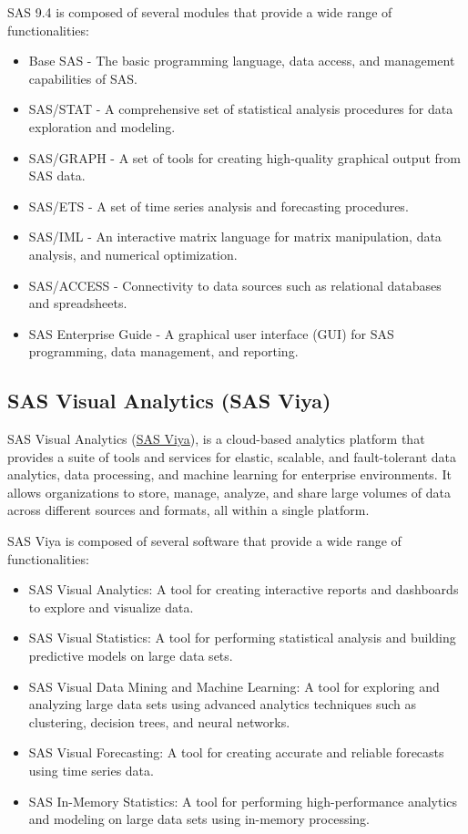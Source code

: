 SAS 9.4 is composed of several modules that provide a wide range of functionalities:
\begin{itemize}
    \item Base SAS - The basic programming language, data access, and management capabilities of SAS.
    \item SAS/STAT - A comprehensive set of statistical analysis procedures for data exploration and modeling.
    \item SAS/GRAPH - A set of tools for creating high-quality graphical output from SAS data.
    \item SAS/ETS - A set of time series analysis and forecasting procedures.
    \item SAS/IML - An interactive matrix language for matrix manipulation, data analysis, and numerical optimization.
    \item SAS/ACCESS - Connectivity to data sources such as relational databases and spreadsheets.
    \item SAS Enterprise Guide - A graphical user interface (GUI) for SAS programming, data management, and reporting.
\end{itemize}

\subsection{SAS Visual Analytics (SAS Viya)}
SAS Visual Analytics (\href{https://documentation.sas.com/doc/en/pgmsascdc/9.4_3.5/pgmsasgswlcm/home.htm}{SAS Viya}), is a cloud-based analytics platform that provides a suite of tools and services for elastic, scalable, and fault-tolerant data analytics, data processing, and machine learning for enterprise environments. It allows organizations to store, manage, analyze, and share large volumes of data across different sources and formats, all within a single platform. 

SAS Viya is composed of several software that provide a wide range of functionalities:

\begin{itemize}
    \item SAS Visual Analytics: A tool for creating interactive reports and dashboards to explore and visualize data.
    \item SAS Visual Statistics: A tool for performing statistical analysis and building predictive models on large data sets.
    \item SAS Visual Data Mining and Machine Learning: A tool for exploring and analyzing large data sets using advanced analytics techniques such as clustering, decision trees, and neural networks.
    \item SAS Visual Forecasting: A tool for creating accurate and reliable forecasts using time series data.
    \item SAS In-Memory Statistics: A tool for performing high-performance analytics and modeling on large data sets using in-memory processing.
\end{itemize}

